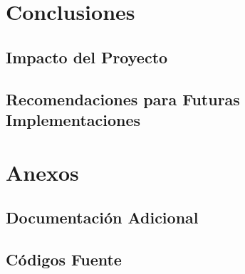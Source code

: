 \documentclass[11pt,a4paper]{article}
\begin{document}
\section{Conclusiones} \subsection{Impacto del Proyecto} \subsection{Recomendaciones para Futuras Implementaciones}

\appendix \section{Anexos} \subsection{Documentación Adicional} \subsection{Códigos Fuente}

 
\end{document}
